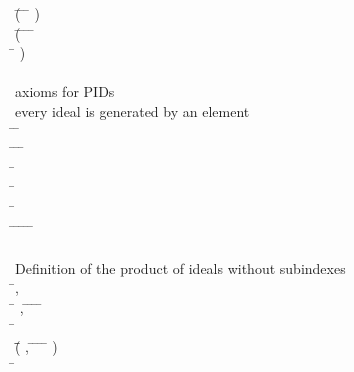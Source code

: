 \begin{hetcasl}
\>\>\>\> \Ax{\wedge} (\=   \Ax{\wedge} \=   \Ax{\Rightarrow} \= \Ax{*}   ) \\
\>\>\>\> \Ax{\wedge} (\=   \Ax{\wedge} \=   \Ax{\wedge} \=   \Ax{\wedge} \= \Ax{+}  \Ax{=}  \\
\>\>\>\>\> \Ax{\Rightarrow} \= \Ax{+}   )\\
\> \\
\> {\small{}\KW{\%\%}axioms for PID\Ax{-}s}\\
\> {\small{}\KW{\%\%}every ideal is generated by an element}\\
\> \PRED \=\Ax{\_\_}\Ax{\_\_} \Ax{:} \= \Ax{\times} \\
\> \Ax{\forall} \= \Ax{:}  \Ax{\bullet} \=\Ax{\exists}  \Ax{:}  \Ax{\bullet} \=  \\
\> \Ax{\forall} \= \Ax{:}  \\
\> \Ax{\bullet} \=\Ax{\forall}  \Ax{:}  \\
\>\> \Ax{\bullet} \=   \\
\>\>\> \Ax{\Leftrightarrow} \=\Ax{\forall}  \Ax{:}  \Ax{\bullet} \=   \Ax{\Rightarrow} \=\Ax{\exists}  \Ax{:}  \Ax{\bullet} \= \Ax{=} \= \Ax{*} \\
\> \\
\> {\small{}\KW{\%\%} Definition of the product of ideals without subindexes}\\
\> \Ax{\forall} \=,  \Ax{:}  \\
\> \Ax{\bullet} \=\Ax{\forall} ,  \Ax{:}  \Ax{\bullet} \=   \Ax{\wedge} \=   \Ax{\Rightarrow} \= \Ax{*}   \= \Ax{**} \\
\> \Ax{\bullet} \=\Ax{\forall}  \Ax{:}  \\
\>\> \Ax{\bullet} \=(\=\Ax{\forall} ,  \Ax{:}  \Ax{\bullet} \=   \Ax{\wedge} \=   \Ax{\Rightarrow} \= \Ax{*}   \= \Ax{**} ) \\
\>\>\> \Ax{\Rightarrow} \= \Ax{**}   \\

\end{hetcasl}
